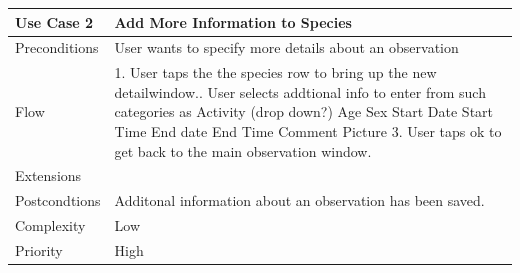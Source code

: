\hspace{2em}

\begin{tabular}[t]{|l|p{}|}\hline
	Use Case 2&Add More Information to Species\\\hline
	Preconditions&User wants to specify more details about an observation\\\hline
	Flow& 1. User taps the the species row to bring up the new detailwindow.\newline
	2. User selects addtional info to enter from such categories as \newline
	Activity (drop down?) \newline
	Age\newline
	Sex\newline
	Start Date\newline
	Start Time\newline
	End date \newline
	End Time \newline
	Comment \newline
	Picture \newline
	3. User taps ok to get back to the main observation window.\\\hline
	Extensions& \\\hline
	Postcondtions&Additonal information about an observation has been saved.\\\hline
	Complexity&Low\\\hline
	Priority&High\\\hline
\end{tabular}

\hspace{2em}

